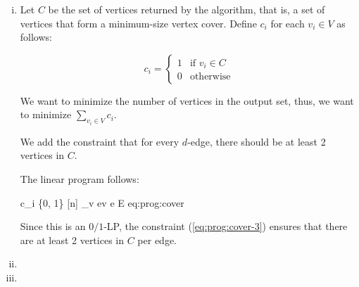 \begin{enumerate}[(i)]
	\item Let $C$ be the set of vertices returned by the algorithm, that is, a set of vertices that form a minimum-size vertex cover.
		Define $c_i$ for each $v_i \in V$ as follows:

		\[
			c_i =
				\begin{cases}
					1   & \text{if } v_i \in C\\
					0   & \text{otherwise}
				\end{cases}
		\]

		We want to minimize the number of vertices in the output set, thus, we want to minimize $\sum_{v_i \in V} c_i$.

		We add the constraint that for every $d$-edge, there should be at least 2 vertices in $C$.

		The linear program follows:

			{c_i \in \left\{0, 1\right\}}    {[n]}
			{\sum_{v \in e}{v} }    {e \in E}
			{eq:prog:cover}

		Since this is an $0/1$-LP, the constraint (\ref{eq:prog:cover-3}) ensures that there are at least 2 vertices in $C$ per edge.
	\item
	\item
\end{enumerate}
